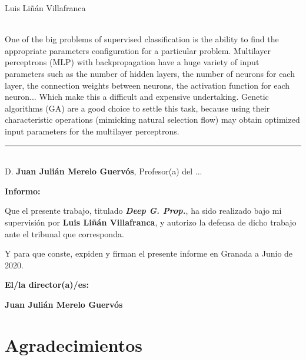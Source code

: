 \begin{center}

    Luis Liñán Villafranca\\

\end{center}

\vspace{0.5cm}
\vspace{0.7cm}

\\

One of the big problems of supervised classification is the ability to find the
appropriate parameters configuration for a particular problem. Multilayer
perceptrons (MLP) with backpropagation have a huge variety of input parameters
such as the number of hidden layers, the number of neurons for each layer, the
connection weights between neurons, the activation function for each neuron...
Which make this a difficult and expensive undertaking. Genetic algorithms (GA)
are a good choice to settle this task, because using their characteristic
operations (mimicking natural selection flow) may obtain optimized input
parameters for the multilayer perceptrons.

\cleardoublepage

\thispagestyle{empty}

\noindent\rule[-1ex]{\textwidth}{2pt}\\[4.5ex]

D. \textbf{Juan Julián Merelo Guervós}, Profesor(a) del ...

\vspace{0.5cm}

\textbf{Informo:}

\vspace{0.5cm}

Que el presente trabajo, titulado \textit{\textbf{Deep G. Prop.}}, ha sido
realizado bajo mi supervisión por \textbf{Luis Liñán Villafranca}, y autorizo
la defensa de dicho trabajo ante el tribunal que corresponda.

\vspace{0.5cm}

Y para que conste, expiden y firman el presente informe en Granada a Junio de
2020.

\vspace{1cm}

\textbf{El/la director(a)/es:}

\vspace{5cm}

\noindent\textbf{Juan Julián Merelo Guervós}

\chapter*{Agradecimientos}




